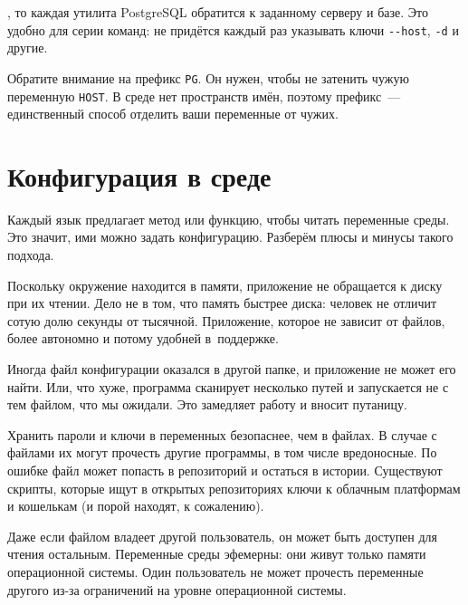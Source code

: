 \else

\begin{english}
\end{english}

\fi

\noindent
, то каждая утилита PostgreSQL обратится к заданному серверу и базе. Это удобно
для серии команд: не придётся каждый раз указывать ключи \verb|--host|,
\verb|-d| и другие.

Обратите внимание на префикс \verb|PG|. Он нужен, чтобы не затенить чужую
переменную \verb|HOST|. В среде нет пространств имён, поэтому префикс~---
единственный способ отделить ваши переменные от чужих.

\section{Конфигурация в среде}

Каждый язык предлагает метод или функцию, чтобы читать переменные среды. Это
значит, ими можно задать конфигурацию. Разберём плюсы и минусы такого подхода.

Поскольку окружение находится в памяти, приложение не обращается к диску при их
чтении. Дело не в том, что память быстрее диска: человек не отличит сотую долю
секунды от тысячной. Приложение, которое не зависит от файлов, более автономно и
потому удобней в~поддержке.

Иногда файл конфигурации оказался в другой папке, и приложение не может его
найти. Или, что хуже, программа сканирует несколько путей и запускается не с тем
файлом, что мы ожидали. Это замедляет работу и вносит путаницу.

\label{password-note}


Хранить пароли и ключи в переменных безопаснее, чем в файлах. В случае с файлами
их могут прочесть другие программы, в том числе вредоносные. По ошибке файл
может попасть в репозиторий и остаться в истории. Существуют скрипты, которые
ищут в открытых репозиториях ключи к облачным платформам и кошелькам (и порой
находят, к сожалению).

Даже если файлом владеет другой пользователь, он может быть доступен для чтения
остальным. Переменные среды эфемерны: они живут только памяти операционной
системы. Один пользователь не может прочесть переменные другого из-за
ограничений на уровне операционной системы.

